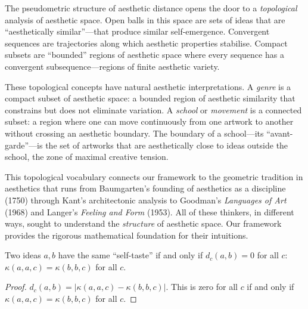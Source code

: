\begin{remark}
\label{rem:topology-aesthetic}
The pseudometric structure of aesthetic distance opens the door to a \emph{topological} analysis of aesthetic space.  Open balls in this space are sets of ideas that are ``aesthetically similar''---that produce similar self-emergence.  Convergent sequences are trajectories along which aesthetic properties stabilise.  Compact subsets are ``bounded'' regions of aesthetic space where every sequence has a convergent subsequence---regions of finite aesthetic variety.

These topological concepts have natural aesthetic interpretations.  A \emph{genre} is a compact subset of aesthetic space: a bounded region of aesthetic similarity that constrains but does not eliminate variation.  A \emph{school} or \emph{movement} is a connected subset: a region where one can move continuously from one artwork to another without crossing an aesthetic boundary.  The boundary of a school---its ``avant-garde''---is the set of artworks that are aesthetically close to ideas outside the school, the zone of maximal creative tension.

This topological vocabulary connects our framework to the geometric tradition in aesthetics that runs from Baumgarten's founding of aesthetics as a discipline (1750) through Kant's architectonic analysis to Goodman's \textit{Languages of Art} (1968) and Langer's \textit{Feeling and Form} (1953).  All of these thinkers, in different ways, sought to understand the \emph{structure} of aesthetic space.  Our framework provides the rigorous mathematical foundation for their intuitions.
\end{remark}

\begin{theorem}
\label{thm:distance-taste}
Two ideas $a, b$ have the same ``self-taste'' if and only if $d_c(a, b) = 0$ for all $c$: $\kappa(a, a, c) = \kappa(b, b, c)$ for all $c$.
\end{theorem}

\begin{proof}
$d_c(a, b) = |\kappa(a, a, c) - \kappa(b, b, c)|$.  This is zero for all $c$ if and only if $\kappa(a, a, c) = \kappa(b, b, c)$ for all $c$.
\end{proof}

